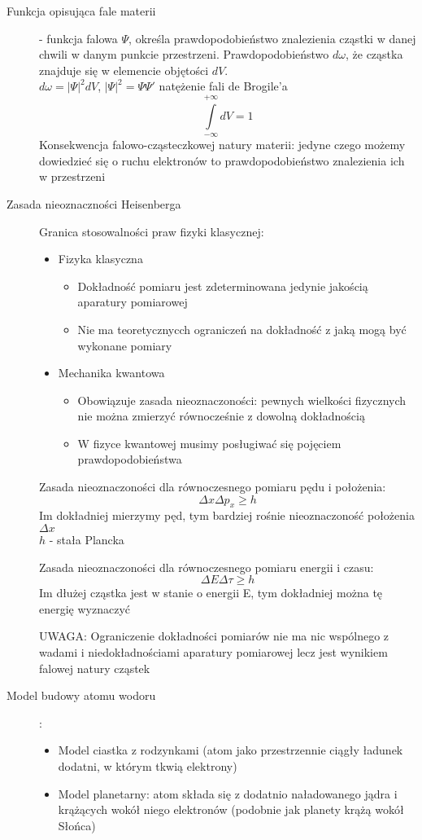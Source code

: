 \documentclass[a4paper,11pt]{article}
\begin{document}
\begin{description}
\item[Funkcja opisująca fale materii] - funkcja falowa $\Psi$, określa prawdopodobieństwo znalezienia cząstki w danej chwili w danym punkcie przestrzeni. Prawdopodobieństwo $d\omega$, że cząstka znajduje się w elemencie objętości $dV$.\\
  $d\omega=|\Psi|^2dV$, $|\Psi|^2 =\Psi\Psi'$ natężenie fali de Brogile'a
  $$\int\limits^{+\infty}_{-\infty}dV=1$$
  Konsekwencja falowo-cząsteczkowej natury materii: jedyne czego możemy dowiedzieć się o ruchu elektronów to prawdopodobieństwo znalezienia ich w przestrzeni
\item[Zasada nieoznaczności Heisenberga] Granica stosowalności praw fizyki klasycznej:
  \begin{itemize}
  \item Fizyka klasyczna
    \begin{itemize}
    \item Dokładność pomiaru jest zdeterminowana jedynie jakością aparatury pomiarowej
    \item Nie ma teoretycznycch ograniczeń na dokładność z jaką mogą być wykonane pomiary
    \end{itemize}
  \item Mechanika kwantowa
    \begin{itemize}
    \item Obowiązuje zasada nieoznaczoności: pewnych wielkości fizycznych nie można zmierzyć równocześnie z dowolną dokładnością
    \item W fizyce kwantowej musimy posługiwać się pojęciem prawdopodobieństwa
    \end{itemize}
  \end{itemize}

  Zasada nieoznaczoności dla równoczesnego pomiaru pędu i położenia:
  $$\Delta x \Delta p_x\geq h$$
  Im dokładniej mierzymy pęd, tym bardziej rośnie nieoznaczoność położenia $\Delta x$\\
  $h$ - stała Plancka

  Zasada nieoznaczoności dla równoczesnego pomiaru energii i czasu:
  $$\Delta E\Delta\tau\geq h$$
  Im dłużej cząstka jest w stanie o energii E, tym dokładniej można tę energię wyznaczyć

  UWAGA: Ograniczenie dokładności pomiarów nie ma nic wspólnego z wadami i niedokładnościami aparatury pomiarowej lecz jest wynikiem falowej natury cząstek

\item[Model budowy atomu wodoru]:
  \begin{itemize}
  \item Model ciastka z rodzynkami (atom jako przestrzennie ciągły ładunek dodatni, w którym tkwią elektrony)
  \item Model planetarny: atom składa się z dodatnio naładowanego jądra i krążących wokół niego elektronów (podobnie jak planety krążą wokół Słońca)
    

\end{itemize}
\end{description}
\end{document}
